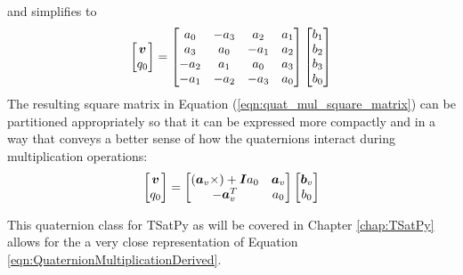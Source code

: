 and simplifies to
\begin{equation}
  \begin{bmatrix} \boldsymbol{v} \\ q_0 \end{bmatrix} =
  \begin{bmatrix}
    a_0 & - a_3 &   a_2 & a_1 \\
    a_3 &   a_0 & - a_1 & a_2 \\
  - a_2 &   a_1 &   a_0 & a_3 \\
  - a_1 & - a_2 & - a_3 & a_0
  \end{bmatrix}
  \begin{bmatrix}
  b_1 \\ b_2 \\ b_3 \\ b_0
  \end{bmatrix}
  \label{eqn:quat_mul_square_matrix}
\end{equation}
The resulting square matrix in Equation (\ref{eqn:quat_mul_square_matrix}) can be partitioned appropriately so that it can be expressed more compactly and in a way that conveys a better sense of how the quaternions interact during multiplication operations:
\begin{equation}
  \begin{bmatrix} \boldsymbol{v} \\ q_0 \end{bmatrix} =
  \begin{bmatrix}
    (\boldsymbol{a}_v \times) + \boldsymbol{I} a_0 & \boldsymbol{a}_v \\
    -\boldsymbol{a}_v^T                    & a_0 \\
  \end{bmatrix}
  \begin{bmatrix}
  \boldsymbol{b}_v \\ b_0
  \end{bmatrix}
  \label{eqn:QuaternionMultiplicationDerived}
\end{equation}

This quaternion class for TSatPy as will be covered in Chapter \ref{chap:TSatPy} allows for the a very close representation of Equation \ref{eqn:QuaternionMultiplicationDerived}.


